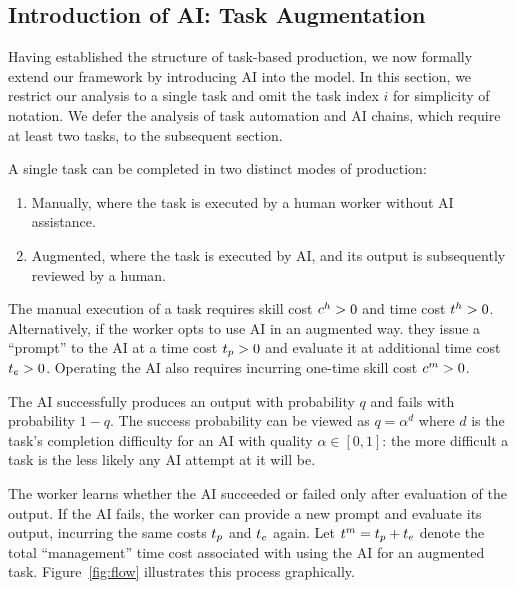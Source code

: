 \documentclass{article}
\theoremstyle{plain}
\theoremstyle{plain}
\begin{document}
\subsection{Introduction of AI: Task Augmentation}

Having established the structure of task-based production, we now formally extend our framework by introducing AI into the model.
In this section, we restrict our analysis to a single task and omit the task index $i$ for simplicity of notation.
We defer the analysis of task automation and AI chains, which require at least two tasks, to the subsequent section.

A single task can be completed in two distinct modes of production:
\begin{enumerate}
\item Manually, where the task is executed by a human worker without AI assistance.
\item Augmented, where the task is executed by AI, and its output is subsequently reviewed by a human.
\end{enumerate}
The manual execution of a task requires skill cost $c^{h}_{} > 0$ and time cost $t^{h}_{} > 0$.
Alternatively, if the worker opts to use AI in an augmented way. they issue a ``prompt'' to the AI at a time cost $t_{p} > 0$ and evaluate it at additional time cost $t_{e} > 0$.
Operating the AI also requires incurring one-time skill cost $c^{m}_{} > 0$.

The AI successfully produces an output with probability $q$ and fails with probability $1-q$. 
The success probability can be viewed as $q=\alpha^d$ where $d$ is the task's completion difficulty for an AI with quality $\alpha \in [0,1]$: the more difficult a task is the less likely any AI attempt at it will be.

The worker learns whether the AI succeeded or failed only after evaluation of the output.
If the AI fails, the worker can provide a new prompt and evaluate its output, incurring the same costs $t_{p}$ and $t_{e}$ again.
Let $t^{m}_{} = t_{p} + t_{e}$ denote the total ``management'' time cost associated with using the AI for an augmented task.
Figure~\ref{fig:flow} illustrates this process graphically.
\end{document}
